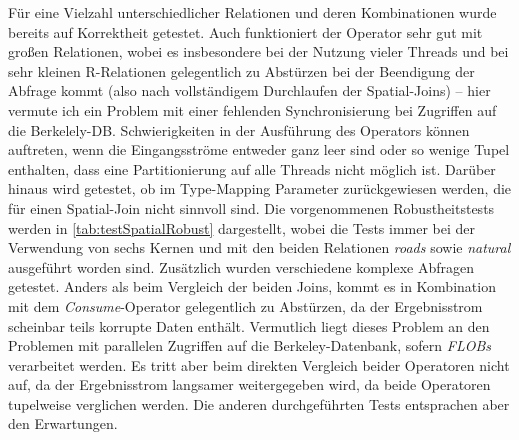 \documentclass[a4paper,12pt,twoside]{article}
\newcommand{\Fb}[1]{\textit{#1}} %
\begin{document}
Für eine Vielzahl unterschiedlicher Relationen und deren Kombinationen wurde bereits auf Korrektheit getestet. Auch funktioniert der Operator sehr gut mit großen Relationen, wobei es insbesondere bei der Nutzung vieler Threads und bei sehr kleinen R-Relationen gelegentlich zu Abstürzen bei der Beendigung der Abfrage kommt (also nach vollständigem Durchlaufen der Spatial-Joins) -- hier vermute ich ein Problem mit einer fehlenden Synchronisierung bei Zugriffen auf die Berkelely-DB. Schwierigkeiten in der Ausführung des Operators können auftreten, wenn die Eingangsströme entweder ganz leer sind oder so wenige Tupel enthalten, dass eine Partitionierung auf alle Threads nicht möglich ist. Darüber hinaus wird getestet, ob im Type-Mapping Parameter zurückgewiesen werden, die für einen Spatial-Join nicht sinnvoll sind. Die vorgenommenen Robustheitstests werden in \autoref{tab:testSpatialRobust} dargestellt, wobei die Tests immer bei der Verwendung von sechs Kernen und mit den beiden Relationen \Fb{roads} sowie \Fb{natural} ausgeführt worden sind. Zusätzlich wurden verschiedene komplexe Abfragen getestet. Anders als beim Vergleich der beiden Joins, kommt es in Kombination mit dem \Fb{Consume}-Operator gelegentlich zu Abstürzen, da der Ergebnisstrom scheinbar teils korrupte Daten enthält. Vermutlich liegt dieses Problem an den Problemen mit parallelen Zugriffen auf die Berkeley-Datenbank, sofern \Fb{FLOBs} verarbeitet werden. Es tritt aber beim direkten Vergleich beider Operatoren nicht auf, da der Ergebnisstrom langsamer weitergegeben wird, da beide Operatoren tupelweise verglichen werden. Die anderen durchgeführten Tests entsprachen aber den Erwartungen.
\end{document}

